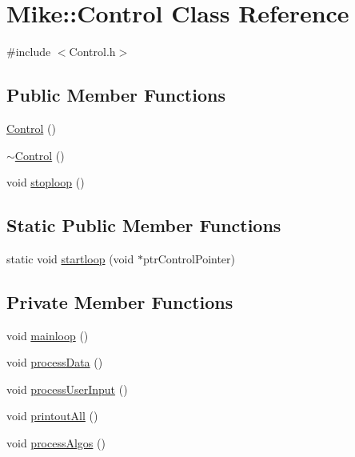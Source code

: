 \hypertarget{class_mike_1_1_control}{}\section{Mike\+:\+:Control Class Reference}
\label{class_mike_1_1_control}


{\ttfamily \#include $<$Control.\+h$>$}

\subsection*{Public Member Functions}
\begin{DoxyCompactItemize}
\item 
\hyperlink{class_mike_1_1_control_ac9a2e3b56773b1eadab7297327a9fbcc}{Control} ()
\item 
\hyperlink{class_mike_1_1_control_aa3395e0509ab5b980732ab0e3a29ce4d}{$\sim$\+Control} ()
\item 
void \hyperlink{class_mike_1_1_control_aa26389eedd6e1c60fa64fe7883ce6ce8}{stoploop} ()
\end{DoxyCompactItemize}
\subsection*{Static Public Member Functions}
\begin{DoxyCompactItemize}
\item 
static void \hyperlink{class_mike_1_1_control_ae34c60ef30c2de2332df13b644c7791f}{startloop} (void $\ast$ptr\+Control\+Pointer)
\end{DoxyCompactItemize}
\subsection*{Private Member Functions}
\begin{DoxyCompactItemize}
\item 
void \hyperlink{class_mike_1_1_control_a3440083f03f7da3d4490fa44bc13d62b}{mainloop} ()
\item 
void \hyperlink{class_mike_1_1_control_a887652b2503a6e881fcceca36f0a0af9}{process\+Data} ()
\item 
void \hyperlink{class_mike_1_1_control_ad06eaf996f971a758eea1fd55eda2565}{process\+User\+Input} ()
\item 
void \hyperlink{class_mike_1_1_control_a2f239c6bace6fba6d31d54919b7ee6e1}{printout\+All} ()
\item 
void \hyperlink{class_mike_1_1_control_acf3d41cb5dd54a2ee31cfb0709a79e7e}{process\+Algos} ()
\end{DoxyCompactItemize}
